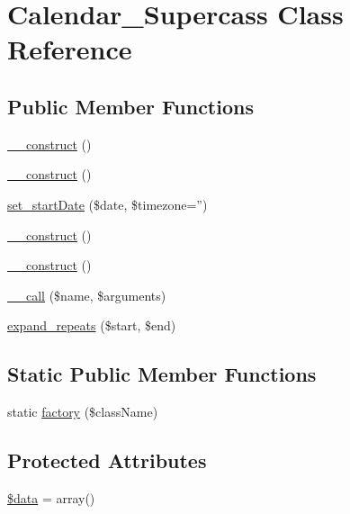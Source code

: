\hypertarget{classCalendar__Supercass}{
\section{Calendar\_\-Supercass Class Reference}
\label{classCalendar__Supercass}
}
\subsection*{Public Member Functions}
\begin{DoxyCompactItemize}
\item 
\hyperlink{classCalendar__Supercass_a095c5d389db211932136b53f25f39685}{\_\-\_\-construct} ()
\item 
\hyperlink{classCalendar__Supercass_a095c5d389db211932136b53f25f39685}{\_\-\_\-construct} ()
\item 
\hyperlink{classCalendar__Supercass_ad5b32584e46ed2d74d0c67bcb9e628ee}{set\_\-startDate} (\$date, \$timezone='')
\item 
\hyperlink{classCalendar__Supercass_a095c5d389db211932136b53f25f39685}{\_\-\_\-construct} ()
\item 
\hyperlink{classCalendar__Supercass_a095c5d389db211932136b53f25f39685}{\_\-\_\-construct} ()
\item 
\hyperlink{classCalendar__Supercass_a3815af62ed9d37b2dcaa175379bbfeca}{\_\-\_\-call} (\$name, \$arguments)
\item 
\hyperlink{classCalendar__Supercass_a874ebcd7e488d259eebddc1a2bc83980}{expand\_\-repeats} (\$start, \$end)
\end{DoxyCompactItemize}
\subsection*{Static Public Member Functions}
\begin{DoxyCompactItemize}
\item 
static \hyperlink{classCalendar__Supercass_a8c0508f1ea0fe72c8d0e6e8dd2a1c41c}{factory} (\$className)
\end{DoxyCompactItemize}
\subsection*{Protected Attributes}
\begin{DoxyCompactItemize}
\item 
\hyperlink{classCalendar__Supercass_a6efc15b5a2314dd4b5aaa556a375c6d6}{\$data} = array()
\end{DoxyCompactItemize}


